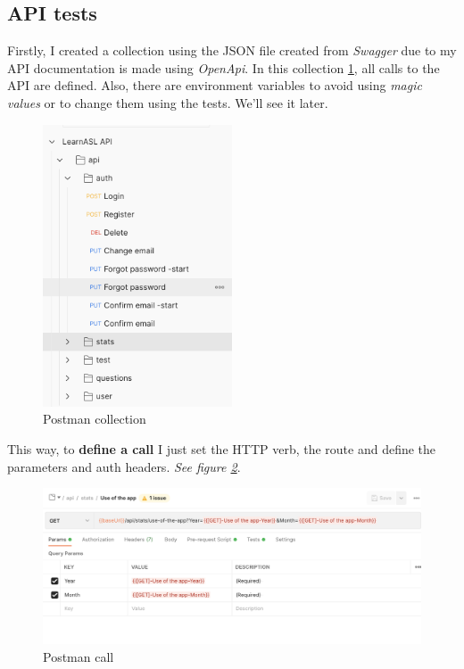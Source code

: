 \subsection{API tests}
Firstly, I created a collection using the JSON file created from \textit{Swagger} due to my API documentation is made using \textit{OpenApi}. 
In this collection \ref{fig:test_collection}, all calls to the API are defined. Also, there are environment variables to avoid using \textit{magic values} or to change them using the tests. We'll see it later.
\begin{figure}[H]
    \centering
        \includegraphics[width=0.5\textwidth]{assets/postman_collection.png}
    \caption{Postman collection}
    \label{fig:test_collection}
\end{figure}

This way, to \textbf{define a call} I just set the HTTP verb, the route and define the parameters and auth headers. \textit{See figure \ref{fig:test_call}}.
\begin{figure}[H]
    \centering
        \includegraphics[width=\textwidth]{assets/postman_call.png}
    \caption{Postman call}
    \label{fig:test_call}
\end{figure}

